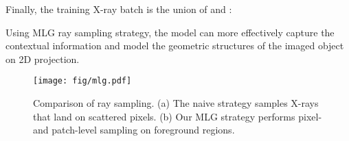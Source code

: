\documentclass[10pt,twocolumn,letterpaper]{article}
\begin{document}
Finally, the training X-ray batch is the union of  and :
\vspace{-2.3mm}

Using MLG ray sampling strategy, the model can more effectively capture the contextual information and model the geometric structures of the imaged object on 2D projection.

\begin{figure}[t]
	\centering
	\hspace{-2.6mm}
	\texttt{[image: fig/mlg.pdf]} \vspace{-2mm}
	\caption{Comparison of ray sampling. (a) The naive strategy samples X-rays that land on scattered pixels. (b) Our MLG strategy performs pixel- and patch-level sampling on foreground regions. }
	\vspace{-2mm}
	\label{fig:mlg}
\end{figure}
\end{document}
